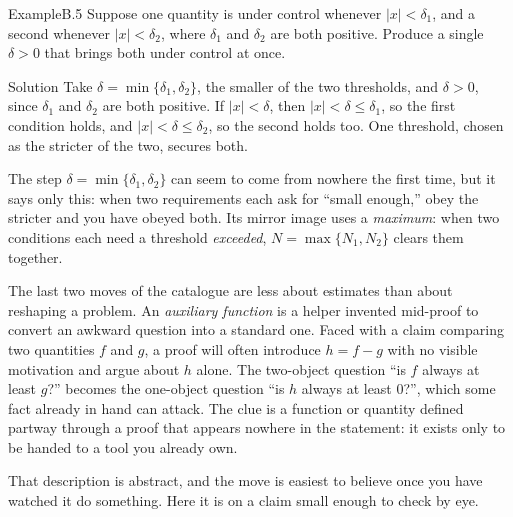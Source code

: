 \documentclass[a4paper,12pt,oneside]{memoir}
\begin{document}
\begin{workedexample}
\begin{envexample}{Example}{B.5}{}
Suppose one quantity is under control whenever \(|x| < \delta_1\), and a second whenever \(|x| < \delta_2\), where \(\delta_1\) and \(\delta_2\) are both positive. Produce a single \(\delta > 0\) that brings both under control at once.
\end{envexample}
\begin{envsolution}{Solution}{}{}
Take \(\delta = \min\{\delta_1, \delta_2\}\), the smaller of the two thresholds, and \(\delta > 0\), since \(\delta_1\) and \(\delta_2\) are both positive. If \(|x| < \delta\), then \(|x| < \delta \le \delta_1\), so the first condition holds, and \(|x| < \delta \le \delta_2\), so the second holds too. One threshold, chosen as the stricter of the two, secures both.

The step \(\delta = \min\{\delta_1, \delta_2\}\) can seem to come from nowhere the first time, but it says only this: when two requirements each ask for “small enough,” obey the stricter and you have obeyed both. Its mirror image uses a \emph{maximum}: when two conditions each need a threshold \emph{exceeded}, \(N = \max\{N_1, N_2\}\) clears them together.
\end{envsolution}
\end{workedexample}
The last two moves of the catalogue are less about estimates than about reshaping a problem. An \emph{auxiliary function} is a helper invented mid-proof to convert an awkward question into a standard one. Faced with a claim comparing two quantities \(f\) and \(g\), a proof will often introduce \(h = f - g\) with no visible motivation and argue about \(h\) alone. The two-object question “is \(f\) always at least \(g\)?” becomes the one-object question “is \(h\) always at least \(0\)?”, which some fact already in hand can attack. The clue is a function or quantity defined partway through a proof that appears nowhere in the statement: it exists only to be handed to a tool you already own.

That description is abstract, and the move is easiest to believe once you have watched it do something. Here it is on a claim small enough to check by eye.
\end{document}
